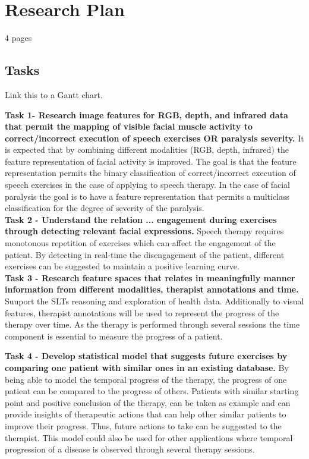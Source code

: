 \chapter{Research Plan}
\label{cha:plan}

4 pages

\section{Tasks}

Link this to a Gantt chart.

\textbf{Task 1- Research image features for RGB, depth, and infrared data that permit the mapping of visible facial muscle activity to correct/incorrect execution of speech exercises OR paralysis severity.} It is expected that by combining different modalities (RGB, depth, infrared) the feature representation of facial activity is improved. The goal is that the feature representation permits the binary classification of correct/incorrect execution of speech exercises in the case of applying to speech therapy. In the case of facial paralysis the goal is to have a feature representation that permits a multiclass classification for the degree of severity of the paralysis.\\

\textbf{Task 2 - Understand the relation ... engagement during exercises through detecting relevant facial expressions.} Speech therapy requires monotonous repetition of exercises which can affect the engagement of the patient. By detecting in real-time the disengagement of the patient, different exercises can be suggested to maintain a positive learning curve. \\

\textbf{Task 3 - Research feature spaces that relates in meaningfully manner information from different modalities, therapist annotations and time.}
Suuport the SLTs reasoning and exploration of health data. 
Additionally to visual features, therapist annotations will be used to represent the progress of the therapy over time. As the therapy is performed through several sessions the time component is essential to measure the progress of a patient. 

\textbf{Task 4 - Develop statistical model that suggests future exercises by comparing one patient with similar ones in an existing database.} By being able to model the temporal progress of the therapy, the progress of one patient can be compared to the progress of others. Patients with similar starting point and positive conclusion of the therapy, can be taken as example and can provide insights of therapeutic actions that can help other similar patients to improve their progress. Thus, future actions to take can be suggested to the therapist. This model could also be used for other applications where temporal progression of a disease is observed through several therapy sessions. 



